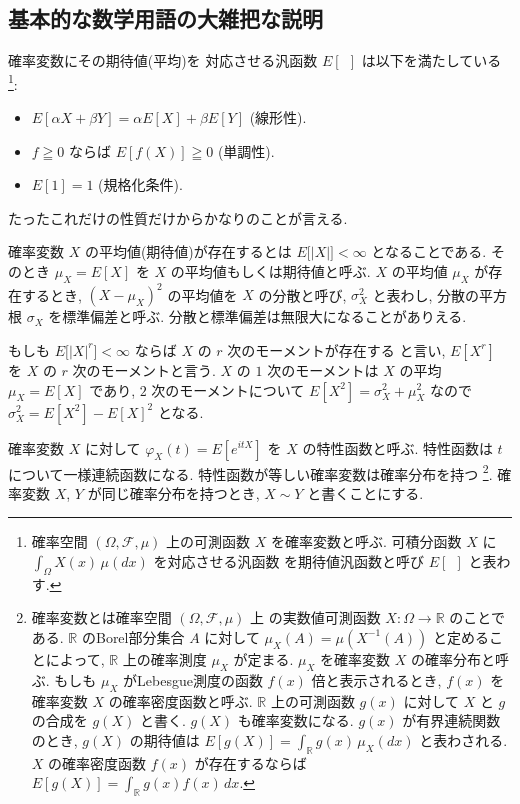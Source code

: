 \documentclass[12pt,twoside]{jarticle}
\newcommand\R{{\mathbb R}} %
\theoremstyle{jplain}
\theoremstyle{jplain}
\theoremstyle{jplain}
\numberwithin{theorem}{section}
\numberwithin{equation}{section}
\numberwithin{figure}{section}
\numberwithin{table}{section}
\begin{document}
\subsection{基本的な数学用語の大雑把な説明}

確率変数にその期待値(平均)を
対応させる汎函数 $E[\ \ ]$ は以下を満たしている%
\footnote{確率空間 $(\Omega,\mathcal{F},\mu)$ 上の可測函数 $X$ を確率変数と呼ぶ. 
可積分函数 $X$ に $\int_\Omega X(x)\,\mu(dx)$ を対応させる汎函数
を期待値汎函数と呼び $E[\ \ ]$ と表わす.}:
\begin{itemize}
\item $E[\alpha X+\beta Y]=\alpha E[X]+\beta E[Y]$ (線形性).
\item $f\geqq 0$ ならば $E[f(X)]\geqq 0$ (単調性).
\item $E[1]=1$ (規格化条件).
\end{itemize}
たったこれだけの性質だけからかなりのことが言える.

確率変数 $X$ の平均値(期待値)が存在するとは $E\bigl[|X|\bigr]<\infty$ となることである. 
そのとき $\mu_X=E[X]$ を $X$ の平均値もしくは期待値と呼ぶ.
$X$ の平均値 $\mu_X$ が存在するとき,  
$(X-\mu_X)^2$ の平均値を $X$ の分散と呼び, 
$\sigma_X^2$ と表わし, 分散の平方根 $\sigma_X$ を標準偏差と呼ぶ.
分散と標準偏差は無限大になることがありえる.

もしも $E\bigl[|X|^r\bigr]<\infty$ ならば $X$ の $r$ 次のモーメントが存在する
と言い, $E[X^r]$ を $X$ の $r$ 次のモーメントと言う.
$X$ の $1$ 次のモーメントは $X$ の平均 $\mu_X=E[X]$ であり, 
$2$ 次のモーメントについて $E[X^2]=\sigma_X^2+\mu_X^2$ 
なので $\sigma_X^2=E[X^2]-E[X]^2$ となる.

確率変数 $X$ に対して $\varphi_X(t)=E[e^{itX}]$ を $X$ の特性函数と呼ぶ.
特性函数は $t$ について一様連続函数になる.
特性函数が等しい確率変数は確率分布を持つ%
\footnote{確率変数とは確率空間 $(\Omega,\mathcal{F},\mu)$ 上
の実数値可測函数 $X:\Omega\to\R$ のことである. 
$\R$ のBorel部分集合 $A$ に対して $\mu_X(A)=\mu(X^{-1}(A))$ と定めることによって, 
$\R$ 上の確率測度 $\mu_X$ が定まる. $\mu_X$ を確率変数 $X$ の確率分布と呼ぶ.
もしも $\mu_X$ がLebesgue測度の函数 $f(x)$ 倍と表示されるとき, 
$f(x)$ を確率変数 $X$ の確率密度函数と呼ぶ.
$\R$ 上の可測函数 $g(x)$ に対して $X$ と $g$ の合成を $g(X)$ と書く.
$g(X)$ も確率変数になる. 
$g(x)$ が有界連続関数のとき, 
$g(X)$ の期待値は $E[g(X)]=\int_\R g(x)\,\mu_X(dx)$ と表わされる. 
$X$ の確率密度函数 $f(x)$ が存在するならば $E[g(X)]=\int_\R g(x)f(x)\,dx$.
}.
確率変数 $X$, $Y$ が同じ確率分布を持つとき, $X\sim Y$ と書くことにする.
\end{document}
